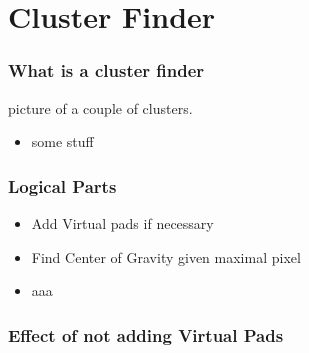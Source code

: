 \documentclass{beamer}
\begin{document}
\section{Cluster Finder}

\begin{frame}
\frametitle{What is a cluster finder} 
picture of a couple of clusters.
\begin{itemize}
\item some stuff

\end{itemize}
\end{frame}

\begin{frame}
  \frametitle{Logical Parts}
  \begin{itemize}
    \item Add Virtual pads if necessary  
    \item Find Center of Gravity given maximal pixel
      \item aaa
  \end{itemize}
\end{frame}

\begin{frame}
  \frametitle{Effect of not adding Virtual Pads}

\end{frame}
\end{document}
